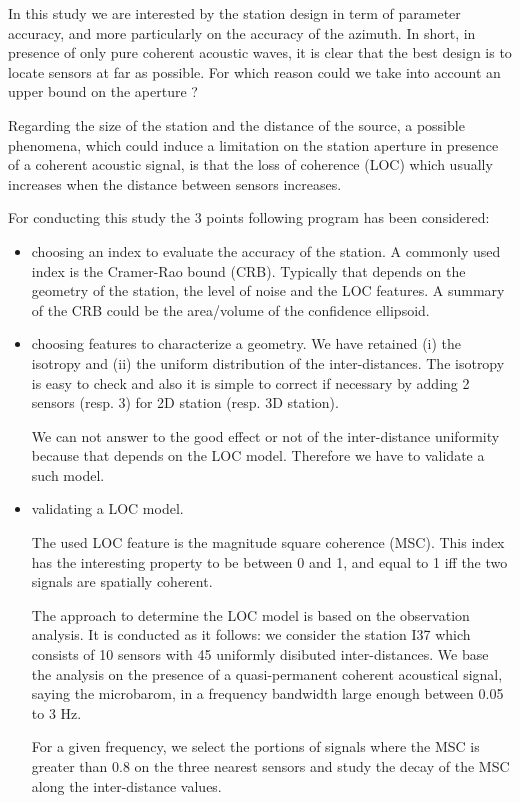 \documentclass[a4paper, 12pt]{report}
\begin{document}
 \sloppy


In this study we are interested by the station design in term of parameter accuracy, and more particularly on the accuracy of the azimuth. In short, in presence of only pure coherent acoustic waves, it is clear that the best design is to locate sensors at far as possible. For which reason could we take into account an upper bound on the aperture ? 

Regarding the size of the station and the distance of the source, a possible phenomena, which could induce a limitation on the station aperture in presence of a coherent acoustic signal, is that the loss of coherence (LOC) which usually increases when the distance between sensors increases.

For conducting this study the 3 points following program has been considered:
\begin{itemize}
 \item
choosing an index to evaluate the accuracy of the station. A commonly used index is the Cramer-Rao bound (CRB). Typically that depends on the geometry of the station, the level of noise and the LOC features. A summary of the CRB could be the area/volume of the confidence ellipsoid.

 \item
choosing features to characterize a geometry. We have retained (i) the isotropy and (ii) the uniform distribution of the inter-distances. The isotropy is easy to check and also it is simple to correct if necessary by adding 2 sensors (resp. 3) for 2D station (resp. 3D station).

We can not answer to the good effect or not of the inter-distance uniformity because that depends on the LOC model. Therefore we have to validate a such model.

\item
validating a LOC model.

The used LOC feature is the magnitude square coherence (MSC). This index has the interesting property to be between 0 and 1, and equal to 1 iff the two signals are spatially coherent.

	The approach to determine the LOC model is based on the observation analysis. It is conducted as it follows: we consider the station I37 which consists of 10 sensors with 45 uniformly disibuted inter-distances. We base the analysis on the presence of a quasi-permanent coherent acoustical signal, saying the microbarom, in a frequency bandwidth large enough between 0.05 to 3 Hz. 

For a given frequency, we select the portions of signals where the MSC is greater than 0.8 on the three nearest sensors and study the decay of the MSC along the inter-distance values.

\end{itemize}
\end{document}
